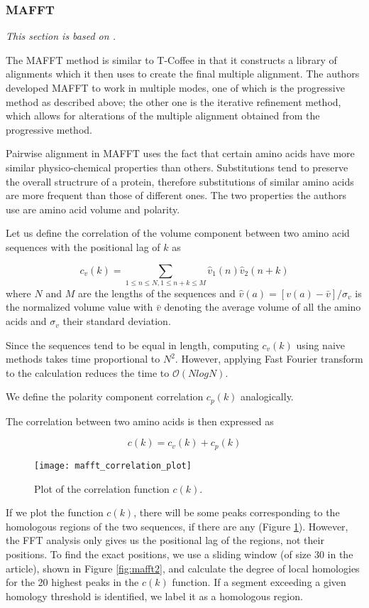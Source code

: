 \subsubsection{MAFFT}

\emph{This section is based on \cite{mafft}.}

The MAFFT method is similar to T-Coffee in that it constructs a library of alignments which it then uses to create the final multiple alignment. The authors developed MAFFT
to work in multiple modes, one of which is the progressive method as described above; the other one is the iterative refinement method, which allows for alterations
of the multiple alignment obtained from the progressive method.

Pairwise alignment in MAFFT uses the fact that certain amino acids have more similar physico-chemical properties than others. Substitutions tend to preserve the
overall structrure of a protein, therefore substitutions of similar amino acids are more frequent than those of different ones. The two properties
the authors use are amino acid volume and polarity.

Let us define the correlation of the volume component between two amino acid sequences with the positional lag of $k$ as

\[
    c_v(k) = \sum_{1\leq n \leq N, 1 \leq n+k \leq M} \hat{v}_1(n) \hat{v}_2(n+k)
\]
where $N$ and $M$ are the lengths of the sequences and $\hat{v}(a) = [v(a) - \bar{v}] / \sigma_v$ is the normalized volume value with $\bar{v}$
denoting the average volume of all the amino acids and $\sigma_v$ their standard deviation.

Since the sequences tend to be equal in length, computing $c_v(k)$ using naive methods takes time proportional to $N^2$. However, applying Fast Fourier
transform to the calculation reduces the time to $\mathcal{O}(N log N)$.

We define the polarity component correlation $c_p(k)$ analogically.

The correlation between two amino acids is then expressed as 

\[
    c(k) = c_v(k) + c_p(k)
\]

\begin{figure}[h]
\centering
\texttt{[image: mafft\_correlation\_plot]}
\caption{Plot of the correlation function $c(k)$. \citep[Figure~1A]{mafft}}
\label{fig:mafft1}
\end{figure}

If we plot the function $c(k)$, there will be some peaks corresponding to the homologous regions of the two sequences, if there are any (Figure \ref{fig:mafft1}). However, the FFT
analysis only gives us the positional lag of the regions, not their positions. To find the exact positions, we use a sliding window (of size 30 in the article), shown in Figure \ref{fig:mafft2},
and calculate the degree of local homologies for the 20 highest peaks in the $c(k)$ function. If a segment exceeding a given homology threshold is identified,
we label it as a homologous region.

